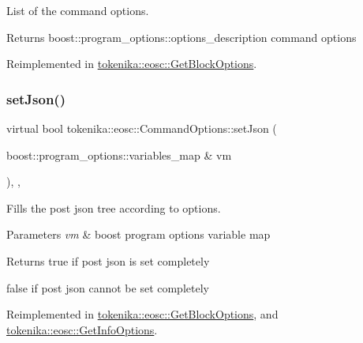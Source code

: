 List of the command options. 

\begin{DoxyReturn}{Returns}
boost\+::program\+\_\+options\+::options\+\_\+description command options 
\end{DoxyReturn}


Reimplemented in \hyperlink{classtokenika_1_1eosc_1_1_get_block_options_a6e8c1a240e5a529c093e0053f12e9ee5}{tokenika\+::eosc\+::\+Get\+Block\+Options}.

\mbox{\label{classtokenika_1_1eosc_1_1_command_options_a7aecc9aa79ca65f6abbd568ff8ff77a7}} 
\subsubsection{\texorpdfstring{set\+Json()}{setJson()}}
{\footnotesize\ttfamily virtual bool tokenika\+::eosc\+::\+Command\+Options\+::set\+Json (\begin{DoxyParamCaption}\item[{boost\+::program\+\_\+options\+::variables\+\_\+map \&}]{vm }\end{DoxyParamCaption})\hspace{0.3cm}{\ttfamily [inline]}, {\ttfamily [protected]}, {\ttfamily [virtual]}}



Fills the post json tree according to options. 


\begin{DoxyParams}{Parameters}
{\em vm} & boost program options variable map \\
\hline
\end{DoxyParams}
\begin{DoxyReturn}{Returns}
true if post json is set completely 

false if post json cannot be set completely 
\end{DoxyReturn}


Reimplemented in \hyperlink{classtokenika_1_1eosc_1_1_get_block_options_a71450327dcf082d00f4c3e3b5c43e619}{tokenika\+::eosc\+::\+Get\+Block\+Options}, and \hyperlink{classtokenika_1_1eosc_1_1_get_info_options_a15688c1262b3d861bd7de015e92dd6a7}{tokenika\+::eosc\+::\+Get\+Info\+Options}.

\mbox{\label{classtokenika_1_1eosc_1_1_command_options_ae2e98c683ae1eb3e5af1e81e60020447}} 
